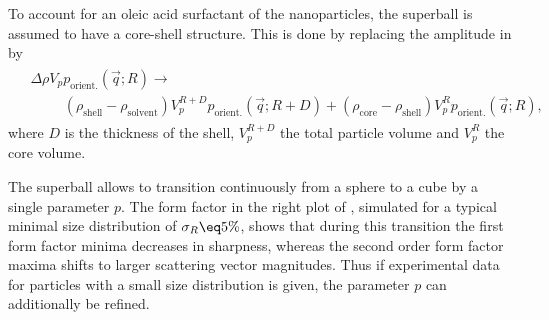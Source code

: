 \documentclass[\main/dresen_thesis.tex]{subfiles}
\begin{document}
    To account for an oleic acid surfactant of the nanoparticles, the superball is assumed to have a core-shell structure.
    This is done by replacing the amplitude in  by
    \begin{align}
      \begin{split}
        &\Delta \rho V_p p_\mathrm{orient.}(\vec{q}; R) \rightarrow\\
        &\hspace{1cm}(\rho_\mathrm{shell} - \rho_\mathrm{solvent}) V_p^{R+D} p_\mathrm{orient.}(\vec{q}; R+D) + (\rho_\mathrm{core} - \rho_\mathrm{shell}) V_p^{R} p_\mathrm{orient.}(\vec{q}; R),
      \end{split}
    \end{align}
    where $D$ is the thickness of the shell, $V_p^{R+D}$ the total particle volume and $V_p^{R}$ the core volume.

    The superball allows to transition continuously from a sphere to a cube by a single parameter $p$.
    The form factor in the right plot of , simulated for a typical minimal size distribution of $\sigma_R \eq 5 \%$, shows that during this transition the first form factor minima decreases in sharpness, whereas the second order form factor maxima shifts to larger scattering vector magnitudes.
    Thus if experimental data for particles with a small size distribution is given, the parameter $p$ can additionally be refined.
\end{document}

